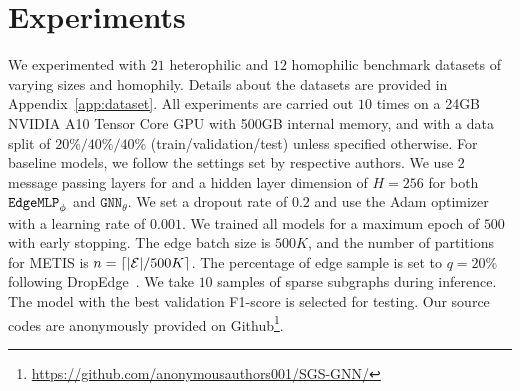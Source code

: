 \section{Experiments}
\label{sec:experiment}

We experimented with $21$ heterophilic and $12$ homophilic benchmark datasets of varying sizes and homophily.
Details about the datasets are provided in Appendix~\ref{app:dataset}.
All experiments are carried out $10$ times on a 24GB NVIDIA A10 Tensor Core GPU with 500GB internal memory, and with a data split of $20\%/40\%/40\%$ (train/validation/test) unless specified otherwise. For baseline models, we follow the settings set by respective authors. We use $2$ message passing layers for \sgs and a hidden layer dimension of $H=256$ for both $\texttt{EdgeMLP}_\phi$ and $\texttt{GNN}_\theta$. We set a dropout rate of $0.2$ and use the Adam optimizer with a learning rate of $0.001$. We trained all models for a maximum epoch of $500$ with early stopping.
The edge batch size is $500K$, and the number of partitions for METIS is $n=\lceil {|{\mathcal{E}}|}/{500K} \rceil$. The percentage of edge sample is set to $q=20\%$ following DropEdge~\cite{rong2019dropedge}. We take $10$ samples of sparse subgraphs during inference. The model with the best validation F1-score is selected for testing. 
Our source codes are anonymously provided on Github\footnote{\textcolor{blue}{\url{https://github.com/anonymousauthors001/SGS-GNN/}}}.

